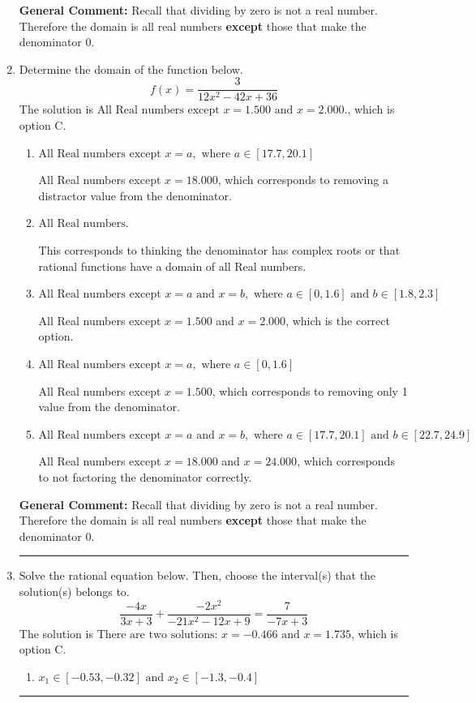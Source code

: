 \documentclass{extbook}[14pt]
\newcommand{\litem}[1]{\item #1

\rule{\textwidth}{0.4pt}}
\begin{document}
\begin{enumerate}
{\textbf{General Comment:} Recall that dividing by zero is not a real number. Therefore the domain is all real numbers \textbf{except} those that make the denominator 0.
}
\litem{
Determine the domain of the function below.
\[ f(x) = \frac{3}{12x^{2} -42 x + 36} \]The solution is \( \text{All Real numbers except } x = 1.500 \text{ and } x = 2.000. \), which is option C.\begin{enumerate}[label=\Alph*.]
\item \( \text{All Real numbers except } x = a, \text{ where } a \in [17.7, 20.1] \)

All Real numbers except $x = 18.000$, which corresponds to removing a distractor value from the denominator.
\item \( \text{All Real numbers.} \)

This corresponds to thinking the denominator has complex roots or that rational functions have a domain of all Real numbers.
\item \( \text{All Real numbers except } x = a \text{ and } x = b, \text{ where } a \in [0, 1.6] \text{ and } b \in [1.8, 2.3] \)

All Real numbers except $x = 1.500$ and $x = 2.000$, which is the correct option.
\item \( \text{All Real numbers except } x = a, \text{ where } a \in [0, 1.6] \)

All Real numbers except $x = 1.500$, which corresponds to removing only 1 value from the denominator.
\item \( \text{All Real numbers except } x = a \text{ and } x = b, \text{ where } a \in [17.7, 20.1] \text{ and } b \in [22.7, 24.9] \)

All Real numbers except $x = 18.000$ and $x = 24.000$, which corresponds to not factoring the denominator correctly.
\end{enumerate}

\textbf{General Comment:} Recall that dividing by zero is not a real number. Therefore the domain is all real numbers \textbf{except} those that make the denominator 0.
}
\litem{
Solve the rational equation below. Then, choose the interval(s) that the solution(s) belongs to.
\[ \frac{-4x}{3x + 3} + \frac{-2x^{2}}{-21x^{2} -12 x + 9} = \frac{7}{-7x + 3} \]The solution is \( \text{There are two solutions: } x = -0.466 \text{ and } x = 1.735 \), which is option C.\begin{enumerate}[label=\Alph*.]
\item \( x_1 \in [-0.53, -0.32] \text{ and } x_2 \in [-1.3,-0.4] \)



\end{enumerate}}
\end{enumerate}
\end{document}
